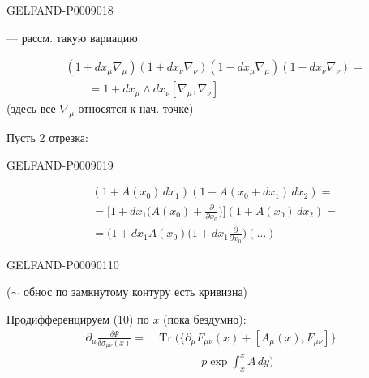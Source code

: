 \begin{GelfandAdjacentEvidence}{GELFAND-P000901}{8}


--- рассм. такую вариацию

\begin{equation*}
\begin{aligned}
&(1+dx_\mu\nabla_\mu)(1+dx_\nu\nabla_\nu)
(1-dx_\mu\nabla_\mu)(1-dx_\nu\nabla_\nu)=\\
&\qquad=1+dx_\mu\wedge dx_\nu[\nabla_\mu,\nabla_\nu]
\end{aligned}
\tag{13}
\end{equation*}
(здесь все $\nabla_\mu$ относятся к нач. точке)

Пусть 2 отрезка:
\end{GelfandAdjacentEvidence}
\begin{GelfandAdjacentEvidence}{GELFAND-P000901}{9}


\begin{equation*}
\begin{aligned}
&(1+A(x_0)\,dx_1)(1+A(x_0+dx_1)\,dx_2)=\\
&=\biggl[1+dx_1\biggl(A(x_0)+\frac{\partial}{\partial x_0}\biggr)\biggr](1+A(x_0)\,dx_2)=\\
&=\bigl(1+dx_1 A(x_0)\biggl(1+dx_1\frac{\partial}{\partial x_0}\biggr)(\ldots)
\end{aligned}
\tag{14}
\end{equation*}
\end{GelfandAdjacentEvidence}
\begin{GelfandAdjacentEvidence}{GELFAND-P000901}{10}


($\sim$ обнос по замкнутому контуру есть кривизна)

Продифференцируем (10) по $x$ (пока бездумно):
\begin{equation*}
\begin{aligned}
\partial_\mu\frac{\delta\Psi}{\delta\sigma_{\mu\nu}(x)}
={}&\operatorname{Tr}\biggl(\{\partial_\mu F_{\mu\nu}(x)+[A_\mu(x),F_{\mu\nu}]\}\\
&\hspace{4em}p\exp\int_x^x A\,dy\biggr)
\end{aligned}
\tag{15}
\end{equation*}
\end{GelfandAdjacentEvidence}



